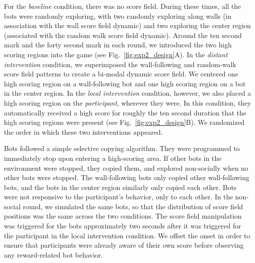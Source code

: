 \documentclass[12pt,letterpaper]{article}
\begin{document}
For the \emph{baseline} condition, there was no score field. During these times, all the bots were randomly exploring, with two randomly exploring along walls (in association with the wall score field dynamic) and two exploring the center region (associated with the random walk score field dynamic). 
Around the ten second mark and the forty second mark in each round, we introduced the two high scoring regions into the game (see Fig.~\ref{fig:exp2_design}A).
In the \textit{distant intervention} condition, we superimposed the wall-following and random-walk score field patterns to create a bi-modal dynamic score field. 
We centered one high scoring region on a wall-following bot and one high scoring region on a bot in the center region. 
In the \textit{local intervention} condition, however, we also placed a high scoring region on the \emph{participant}, wherever they were. 
In this condition, they automatically received a high score for roughly the ten second duration that the high scoring regions were present (see Fig.~\ref{fig:exp2_design}B). 
We randomized the order in which these two interventions appeared.

Bots followed a simple selective copying algorithm. 
They were programmed to immediately stop upon entering a high-scoring area.
If other bots in the environment were stopped, they copied them, and explored non-socially when no other bots were stopped.
The wall-following bots only copied other wall-following bots, and the bots in the center region similarly only copied each other.
Bots were not responsive to the participant's behavior, only to each other.
In the non-social round, we simulated the same bots, so that the distribution of score field positions was the same across the two conditions. 
The score field manipulation was triggered for the bots approximately two seconds after it was triggered for the participant in the local intervention condition. 
We offset the onset in order to ensure that participants were already aware of their own score before observing any reward-related bot behavior.


\end{document}
